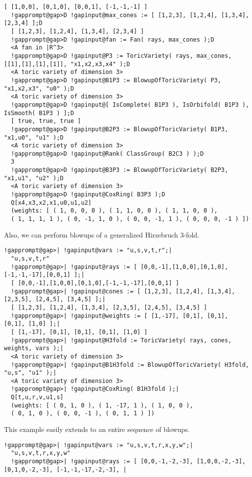 \documentclass[a4paper,11pt]{report}
\begin{document}
{{{\begin{Verbatim}[commandchars=!@D,fontsize=\small,frame=single,label=Example]
  [ [1,0,0], [0,1,0], [0,0,1], [-1,-1,-1] ]
  !gapprompt@gap>D !gapinput@max_cones := [ [1,2,3], [1,2,4], [1,3,4], [2,3,4] ];D
  [ [1,2,3], [1,2,4], [1,3,4], [2,3,4] ]
  !gapprompt@gap>D !gapinput@fan := Fan( rays, max_cones );D
  <A fan in |R^3>
  !gapprompt@gap>D !gapinput@P3 := ToricVariety( rays, max_cones, [[1],[1],[1],[1]], "x1,x2,x3,x4" );D
  <A toric variety of dimension 3>
  !gapprompt@gap>D !gapinput@B1P3 := BlowupOfToricVariety( P3, "x1,x2,x3", "u0" );D
  <A toric variety of dimension 3>
  !gapprompt@gap>D !gapinput@[ IsComplete( B1P3 ), IsOrbifold( B1P3 ), IsSmooth( B1P3 ) ];D
  [ true, true, true ]
  !gapprompt@gap>D !gapinput@B2P3 := BlowupOfToricVariety( B1P3, "x1,u0", "u1" );D
  <A toric variety of dimension 3>
  !gapprompt@gap>D !gapinput@Rank( ClassGroup( B2C3 ) );D
  3
  !gapprompt@gap>D !gapinput@B3P3 := BlowupOfToricVariety( B2P3, "x1,u1", "u2" );D
  <A toric variety of dimension 3>
  !gapprompt@gap>D !gapinput@CoxRing( B3P3 );D
  Q[x4,x3,x2,x1,u0,u1,u2]
  (weights: [ ( 1, 0, 0, 0 ), ( 1, 1, 0, 0 ), ( 1, 1, 0, 0 ), 
  ( 1, 1, 1, 1 ), ( 0, -1, 1, 0 ), ( 0, 0, -1, 1 ), ( 0, 0, 0, -1 ) ])
\end{Verbatim}
 Also, we can perform blowups of a generalized Hirzebruch 3-fold. 
\begin{Verbatim}[commandchars=!@|,fontsize=\small,frame=single,label=Example]
  !gapprompt@gap>| !gapinput@vars := "u,s,v,t,r";|
  "u,s,v,t,r"
  !gapprompt@gap>| !gapinput@rays := [ [0,0,-1],[1,0,0],[0,1,0],[-1,-1,-17],[0,0,1] ];|
  [ [0,0,-1],[1,0,0],[0,1,0],[-1,-1,-17],[0,0,1] ]
  !gapprompt@gap>| !gapinput@cones := [ [1,2,3], [1,2,4], [1,3,4], [2,3,5], [2,4,5], [3,4,5] ];|
  [ [1,2,3], [1,2,4], [1,3,4], [2,3,5], [2,4,5], [3,4,5] ]
  !gapprompt@gap>| !gapinput@weights := [ [1,-17], [0,1], [0,1], [0,1], [1,0] ];|
  [ [1,-17], [0,1], [0,1], [0,1], [1,0] ]
  !gapprompt@gap>| !gapinput@H3fold := ToricVariety( rays, cones, weights, vars );|
  <A toric variety of dimension 3>
  !gapprompt@gap>| !gapinput@B1H3fold := BlowupOfToricVariety( H3fold, "u,s", "u1" );|
  <A toric variety of dimension 3>
  !gapprompt@gap>| !gapinput@CoxRing( B1H3fold );|
  Q[t,u,r,v,u1,s]
  (weights: [ ( 0, 1, 0 ), ( 1, -17, 1 ), ( 1, 0, 0 ), 
  ( 0, 1, 0 ), ( 0, 0, -1 ), ( 0, 1, 1 ) ])
\end{Verbatim}
 This example easily extends to an entire sequence of blowups. 
\begin{Verbatim}[commandchars=!@|,fontsize=\small,frame=single,label=Example]
  !gapprompt@gap>| !gapinput@vars := "u,s,v,t,r,x,y,w";|
  "u,s,v,t,r,x,y,w"
  !gapprompt@gap>| !gapinput@rays := [ [0,0,-1,-2,-3], [1,0,0,-2,-3], [0,1,0,-2,-3], [-1,-1,-17,-2,-3], |

\end{Verbatim}}}}
\end{document}
